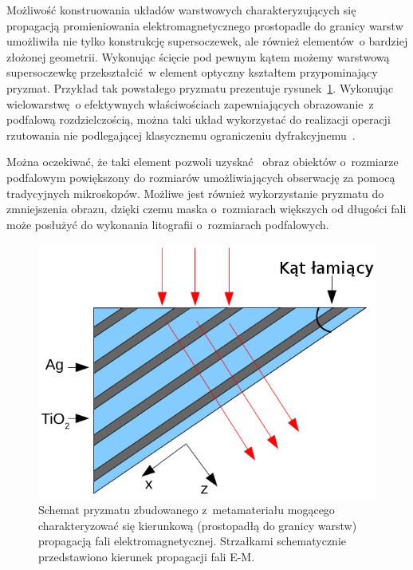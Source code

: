 Możliwość konstruowania układów warstwowych charakteryzujących się propagacją promieniowania elektromagnetycznego prostopadle do granicy warstw umożliwiła nie tylko konstrukcję supersoczewek, ale również elementów~o bardziej złożonej geometrii. Wykonując ścięcie pod pewnym kątem możemy warstwową supersoczewkę przekształcić~w element optyczny kształtem przypominający pryzmat. Przykład tak powstałego pryzmatu prezentuje rysunek~\ref{fig:prism-schema}. Wykonując wielowarstwę~o efektywnych właściwościach zapewniających obrazowanie~z podfalową rozdzielczością, można taki układ wykorzystać do realizacji operacji rzutowania nie podlegającej klasycznemu ograniczeniu dyfrakcyjnemu~\cite{prism2010}. 

Można oczekiwać, że taki element pozwoli uzyskać~ obraz obiektów o~rozmiarze podfalowym powiększony do rozmiarów umożliwiających obserwację za pomocą tradycyjnych mikroskopów. Możliwe jest również wykorzystanie pryzmatu do zmniejszenia obrazu, dzięki czemu maska o~rozmiarach większych od długości fali może posłużyć do wykonania litografii o~rozmiarach podfalowych.

			\begin{figure}[tbH]
				\includegraphics[width=\textwidth]{images/multilayer/prism.png}
				\caption{Schemat pryzmatu zbudowanego z~metamateriału mogącego charakteryzować się kierunkową (prostopadłą do granicy warstw) propagacją fali elektromagnetycznej. Strzałkami schematycznie przedstawiono kierunek propagacji fali E-M.}
				\label{fig:prism-schema}
			\end{figure}



